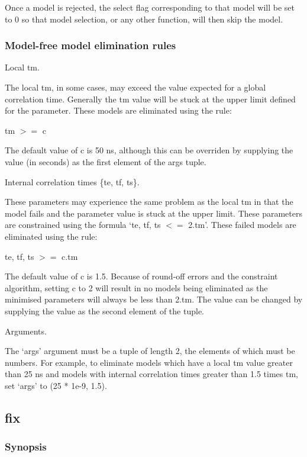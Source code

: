 Once a model is rejected, the select flag corresponding to that model will be set to 0 so
that model selection, or any other function, will then skip the model.



\subsubsection{Model-free model elimination rules}

Local tm.

The local tm, in some cases, may exceed the value expected for a global correlation time.
Generally the tm value will be stuck at the upper limit defined for the parameter.  These
models are eliminated using the rule:

    tm $>=$ c

The default value of c is 50 ns, although this can be overriden by supplying the value (in
seconds) as the first element of the args tuple.


Internal correlation times \{te, tf, ts\}.

These parameters may experience the same problem as the local tm in that the model fails and
the parameter value is stuck at the upper limit.  These parameters are constrained using the
formula `te, tf, ts $<=$ 2.tm'.  These failed models are eliminated using the rule:

    te, tf, ts $>=$ c.tm

The default value of c is 1.5.  Because of round-off errors and the constraint algorithm,
setting c to 2 will result in no models being eliminated as the minimised parameters will
always be less than 2.tm.  The value can be changed by supplying the value as the second
element of the tuple.


Arguments.

The `args' argument must be a tuple of length 2, the elements of which must be numbers.  For
example, to eliminate models which have a local tm value greater than 25 ns and models with
internal correlation times greater than 1.5 times tm, set `args' to (25 * 1e-9, 1.5).


\newpage

\subsection{fix}


\subsubsection{Synopsis}

